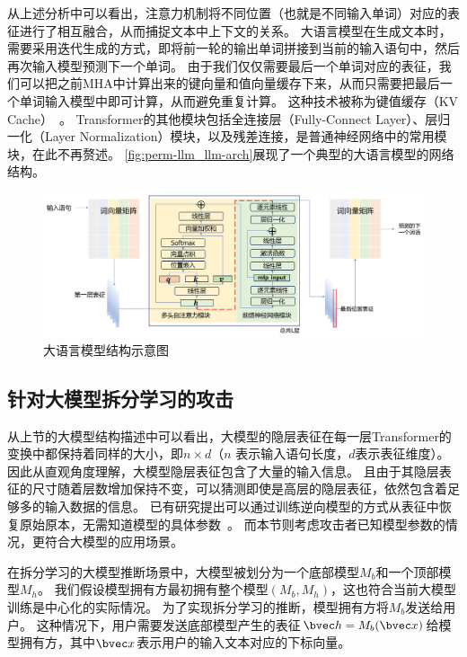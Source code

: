 从上述分析中可以看出，注意力机制将不同位置（也就是不同输入单词）对应的表征进行了相互融合，从而捕捉文本中上下文的关系。
%
大语言模型在生成文本时，需要采用迭代生成的方式，即将前一轮的输出单词拼接到当前的输入语句中，然后再次输入模型预测下一个单词。
%
由于我们仅仅需要最后一个单词对应的表征，我们可以把之前MHA中计算出来的键向量和值向量缓存下来，从而只需要把最后一个单词输入模型中即可计算，从而避免重复计算。
%
这种技术被称为键值缓存（KV Cache）~\cite{pope_2023_efficiently_kv_cache}。
%
Transformer的其他模块包括全连接层（Fully-Connect Layer）、层归一化（Layer Normalization）模块，以及残差连接，是普通神经网络中的常用模块，在此不再赘述。
%
\autoref{fig:perm-llm_llm-arch}展现了一个典型的大语言模型的网络结构。

\begin{figure}[htbp]
    \centering
    \includegraphics[width=\linewidth]{Z_Resources/perm-llm_llm-architecture.png}
    \caption{大语言模型结构示意图}
    \label{fig:perm-llm_llm-arch}
\end{figure}


\subsection{针对大模型拆分学习的攻击}
从上节的大模型结构描述中可以看出，大模型的隐层表征在每一层Transformer的变换中都保持着同样的大小，即$n \times d$（$n$ 表示输入语句长度，$d$表示表征维度）。
%
因此从直观角度理解，大模型隐层表征包含了大量的输入信息。
且由于其隐层表征的尺寸随着层数增加保持不变，可以猜测即使是高层的隐层表征，依然包含着足够多的输入数据的信息。
%
已有研究提出可以通过训练逆向模型的方式从表征中恢复原始原本，无需知道模型的具体参数~\cite{morris2023embedding_almost}。
而本节则考虑攻击者已知模型参数的情况，更符合大模型的应用场景。


在拆分学习的大模型推断场景中，大模型被划分为一个底部模型$M_b$和一个顶部模型$M_h$。
%
我们假设模型拥有方最初拥有整个模型$(M_b, M_h)$，这也符合当前大模型训练是中心化的实际情况。
%
为了实现拆分学习的推断，模型拥有方将$M_b$发送给用户。
%
这种情况下，用户需要发送底部模型产生的表征$\bvec h = M_b(\bvec x)$给模型拥有方，其中$\bvec x$表示用户的输入文本对应的下标向量。

